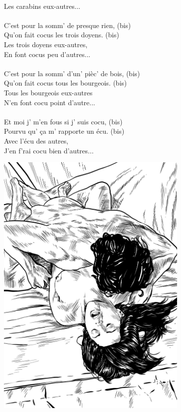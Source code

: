 \\Les carabins eux-autres...
\breakpage
\\\\C'est pour la somm' de presque rien, (bis)
\\Qu'on fait cocus les trois doyens. (bis)
\\Les trois doyens eux-autres,
\\En font cocus peu d'autres...
\\\\C'est pour la somm' d'un' pièc' de bois, (bis)
\\Qu'on fait cocus tous les bourgeois. (bis)
\\Tous les bourgeois eux-autres
\\N'en font cocu point d'autre...
\\\\Et moi j' m'en fous si j' suis cocu, (bis)
\\Pourvu qu' ça m' rapporte un écu. (bis)
\\Avec l'écu des autres,
\\J'en f'rai cocu bien d'autres...
\vspace{0.5cm}
\begin{center}
\includegraphics[width=0.7\textwidth]{images/brev73.png}
\end{center}


\breakpage